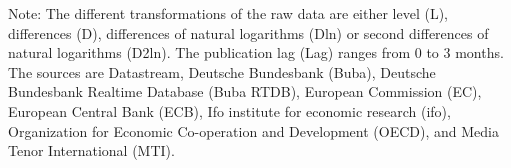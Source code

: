 \documentclass[10pt]{article}
\begin{document}
{\tiny{}
Note: The different transformations of the raw data are either level (L), differences (D), differences of natural logarithms (Dln) or second differences of natural logarithms (D2ln). The publication lag (Lag) ranges from 0 to 3 months. The sources are Datastream, Deutsche Bundesbank (Buba), Deutsche Bundesbank Realtime Database (Buba RTDB), European Commission (EC), European Central Bank (ECB), Ifo institute for economic research (ifo), 
Organization for Economic Co-operation and Development (OECD), and Media Tenor International (MTI).
}

\end{document}

